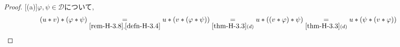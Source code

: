 \begin{proof}

[(a)]\(\varphi, \psi \in \mathcal{D}\)について, 
\[
(u \ast v) \ast (\varphi \ast \psi)
\underset{\ref{rem-H-3.8}, \ref{defn-H-3.4}}{=} u \ast (v \ast (\varphi \ast \psi))
\underset{\ref{thm-H-3.3}(d)}{=} u \ast ((v \ast \varphi) \ast \psi)
\underset{\ref{thm-H-3.3}(d)}{=} u \ast (\psi \ast (v \ast \varphi))
\]
\end{proof}

